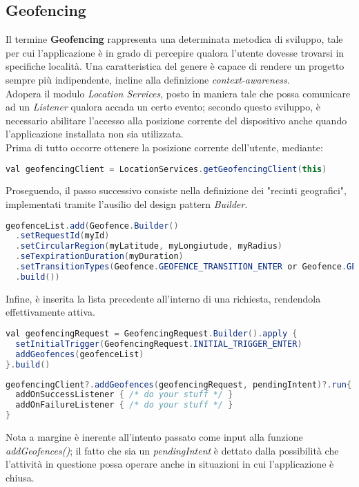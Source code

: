 \documentclass{article}
\begin{document}
\subsection*{Geofencing}
Il termine \textbf{Geofencing} rappresenta una determinata metodica di sviluppo, tale per cui l'applicazione è in grado di percepire qualora l'utente dovesse trovarsi in specifiche località. Una caratteristica del genere è capace di rendere un progetto sempre più indipendente, incline alla definizione \textit{context-awareness}.\vspace*{7pt}\\
Adopera il modulo \textit{Location Services}, posto in maniera tale che possa comunicare ad un \textit{Listener} qualora accada un certo evento; secondo questo sviluppo, è necessario abilitare l'accesso alla posizione corrente del dispositivo anche quando l'applicazione installata non sia utilizzata.\vspace*{7pt}\\
Prima di tutto occorre ottenere la posizione corrente dell'utente, mediante:
\begin{lstlisting}[language=JAVA]
val geofencingClient = LocationServices.getGeofencingClient(this)
\end{lstlisting}
Proseguendo, il passo successivo consiste nella definizione dei "recinti geografici", implementati tramite l'ausilio del design pattern \textit{Builder}.
\begin{lstlisting}[language=JAVA]
geofenceList.add(Geofence.Builder()
  .setRequestId(myId)
  .setCircularRegion(myLatitude, myLongiutude, myRadius)
  .seTexpirationDuration(myDuration)  
  .setTransitionTypes(Geofence.GEOFENCE_TRANSITION_ENTER or Geofence.GEOFENCE_TRANSITION_EXIT)
  .build())
\end{lstlisting}
Infine, è inserita la lista precedente all'interno di una richiesta, rendendola effettivamente attiva.
\begin{lstlisting}[language=JAVA]
val geofencingRequest = GeofencingRequest.Builder().apply {
  setInitialTrigger(GeofencingRequest.INITIAL_TRIGGER_ENTER)
  addGeofences(geofenceList)
}.build()
\end{lstlisting}
\begin{lstlisting}[language=JAVA]
geofencingClient?.addGeofences(geofencingRequest, pendingIntent)?.run{
  addOnSuccessListener { /* do your stuff */ }
  addOnFailureListener { /* do your stuff */ } 
}
\end{lstlisting}
Nota a margine è inerente all'intento passato come input alla funzione \textit{addGeofences()}; il fatto che sia un \textit{pendingIntent} è dettato dalla possibilità che l'attività in questione possa operare anche in situazioni in cui l'applicazione è chiusa. 
\end{document}
